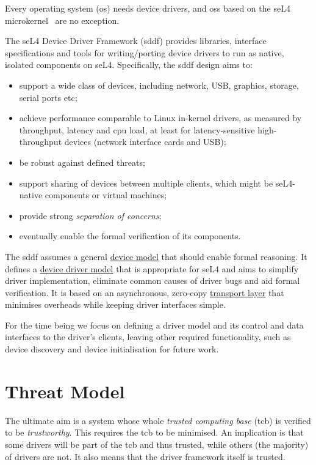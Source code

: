 \documentclass[a4paper,12pt]{report}
\begin{document}
Every operating system (\gls{os}) needs device drivers, and \glspl{os} based on the seL4
microkernel~\citep{Klein_EHACDEEKNSTW_09, sel4:URL} are no exception.

The seL4 Device Driver Framework (\gls{sddf}) provides libraries, interface specifications and tools
for writing/porting device drivers to run as native, isolated
components on seL4. Specifically, the \gls{sddf} design aims to:
\begin{itemize}
\item support a wide class of devices, including network, USB,
  graphics, storage, serial ports etc;
\item achieve performance comparable
  to Linux in-kernel drivers, as measured by throughput, latency and \gls{cpu}
  load, at least for latency-sensitive  high-throughput devices
  (network interface cards and USB);
\item  be robust against  defined threats;
\item support sharing of devices between multiple clients, which might be
  seL4-native components or virtual machines;
\item provide strong \emph{separation of concerns};
\item eventually enable the formal verification of its components.
\end{itemize}

The \gls{sddf} assumes a general  \hyperref[s:device]{device model} that should enable
formal reasoning. It defines a \hyperref[s:driver]{device driver model}
that is appropriate for seL4 and aims to simplify driver
implementation, eliminate common causes of driver bugs and aid formal
verification. It is based on an asynchronous, zero-copy \hyperref[s:transport]{transport
  layer} that minimises overheads while keeping driver interfaces simple.

For the time being we focus on defining a driver model and its control
and data interfaces to the driver's clients, leaving other required
functionality, such as device discovery and device initialisation for
future work.


\chapter{Threat Model}\label{s:threats}

The ultimate aim is a system whose whole \emph{trusted computing base}
(\gls{tcb}) is verified to be \emph{trustworthy}. This requires the \gls{tcb} to be
minimised. An implication is that some drivers will be part of the \gls{tcb}
and thus trusted, while others (the majority) of drivers are not. It
also means that the driver framework itself is trusted.
\end{document}
